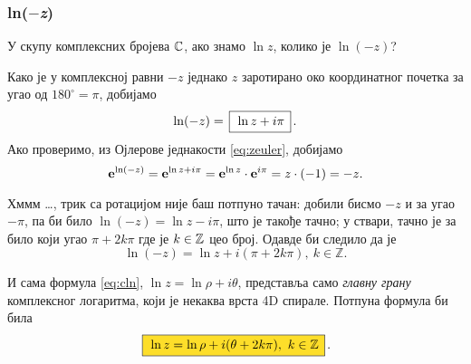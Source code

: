 \subsubsection{ln($-$\textit{z})}

\zadatak 
У скупу комплексних бројева ${\mathbb C}$, ако знамо $\ln z$,
колико је $\ln(-z)$?

\resenje 
Како је у комплексној равни $-z$ једнако $z$ заротирано
око координатног почетка
за угао од $180^\circ=\pi$, добијамо
$$
\ln (-z) = \ram{\ln z +i\pi}.
$$ 
Ако проверимо, из Ојлерове једнакости \eqref{eq:zeuler}, добијамо
$$
{\bf e}^{\ln(-z)} = {\bf e}^{\ln z+i\pi} = {\bf e}^{\ln z}\cdot {\bf e}^{i\pi}=z \cdot (-1)=-z.
$$

\dodatak Хммм \dots, трик са ротацијом није баш потпуно тачан: добили бисмо $-z$ и за угао $-\pi$,
па би било $\ln(-z)=\ln z-i\pi$, што је такође тачно;
у ствари, тачно је за било који угао $\pi+2k\pi$ где је $k\in{\mathbb Z}$ цео број. Одавде би следило да је
$$
\ln(-z) = \ln z + i(\pi+2k\pi),\ k\in{\mathbb Z}.
$$

И сама формула \eqref{eq:cln}, $\ln z=\ln\rho + i\theta$, представља само {\sl главну грану\/}
комплексног логаритма, који је некаква врста 4D спирале. Потпуна формула би била
\begin{equation}
    \okvir{\ln z=\ln\rho + i(\theta + 2k\pi),\ k\in\Zset} .
\end{equation}